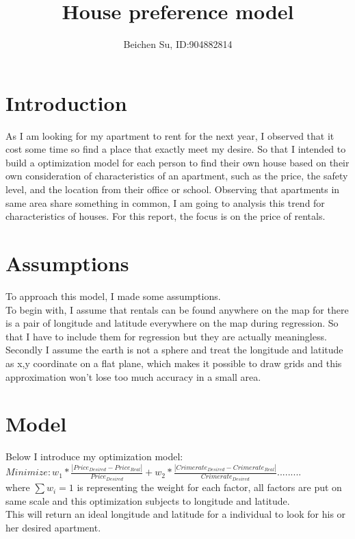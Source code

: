 \documentclass[a4paper]{article}
\title{House preference model}
\author{Beichen Su, ID:904882814}
\begin{document}

\maketitle

\section{Introduction}
As I am looking for my apartment to rent for the next year, I observed that it cost some time so find a place that exactly meet my desire. So that I intended to build a optimization model for each person to find their own house based on their own consideration of characteristics of an apartment, such as the price, the safety level, and the location from their office or school. Observing that apartments in same area share something in common, I am going to analysis this trend for characteristics of houses. For this report, the focus is on the price of rentals.


\section{Assumptions}
To approach this model, I made some assumptions.\\
To begin with, I assume that rentals can be found anywhere on the map for there is a pair of longitude and latitude everywhere on the map during regression. So that I have to include them for regression but they are actually meaningless.\\
Secondly I assume the earth is not a sphere and treat the longitude and latitude as x,y coordinate on a flat plane, which makes it possible to draw grids and this approximation won't lose too much accuracy in a small area.\\


\section{Model}
Below I introduce my optimization model:\\
$Minimize: w_1 * \frac{|Price_{Desired} - Price_{Real}|}{Price_{Desired}} + w_2 * \frac{|Crime rate_{Desired} - Crime rate_{Real}|}{Crime rate_{Desired}}.........$\\

where $\sum w_i = 1$ is representing the weight for each factor, all factors are put on same scale and this optimization subjects to longitude and latitude.\\
This will return an ideal longitude and latitude for a individual to look for his or her desired apartment. 
\end{document}
